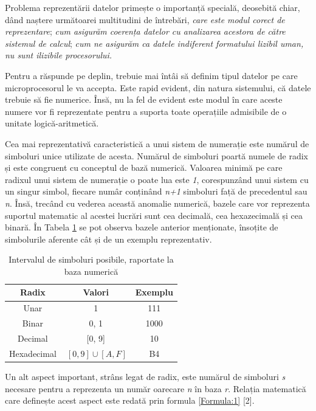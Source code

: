 \documentclass[12pt]{article}
\begin{document}
Problema reprezentării datelor primește o importanță specială, deosebită chiar, dând naștere următoarei multitudini de întrebări, \textit{care este modul corect de reprezentare}; \textit{cum asigurăm coerența datelor cu analizarea acestora de către sistemul de calcul}; \textit{cum ne asigurăm ca datele indiferent formatului lizibil uman, nu sunt ilizibile procesorului.}


Pentru a răspunde pe deplin, trebuie mai întâi să definim tipul datelor pe care microprocesorul le va accepta. Este rapid evident, din natura sistemului, că datele trebuie să fie numerice. Însă, nu la fel de evident este modul în care aceste numere vor fi reprezentate pentru a suporta toate operațiile admisibile de o unitate logică-aritmetică.

Cea mai reprezentativă caracteristică a unui sistem de numerație este numărul de simboluri unice utilizate de acesta. Numărul de simboluri poartă numele de radix și este congruent cu conceptul de bază numerică. Valoarea minimă pe care radixul unui sistem de numerație o poate lua este \textit{1}, corespunzând unui sistem cu un singur simbol, fiecare numâr conținând \textit{n+1} simboluri față de precedentul sau \textit{n}. Însă, trecând cu vederea această anomalie numerică, bazele care vor reprezenta suportul matematic al acestei lucrări sunt cea decimală, cea hexazecimală și cea binară. În Tabela \ref{Tabela:1} se pot observa bazele anterior menționate, însoțite de simbolurile aferente cât și de un exemplu reprezentativ.

\begin{table}[h]
\centering

\begin{tabular}{ ||c|c|c|| }
 \hline
 Radix & Valori & Exemplu \\ 
 \hline  \hline
 Unar & 1 & 111\\
 \hline
 Binar & 0, 1 & 1000\\ 
 \hline
 Decimal & [0, 9]  & 10\\ 
 \hline 
 Hexadecimal & $\ [0, 9] \cup [A, F]$ & B4\\ 
 \hline
\end{tabular} \caption{Intervalul de simboluri posibile, raportate la baza numerică }
 \label{Tabela:1}
\end{table}

Un alt aspect important, strâns legat de radix, este numărul de simboluri \textit{s} necesare pentru a reprezenta un număr oarecare \textit{n} în baza \textit{r}. Relația matematică care definește acest aspect este redată prin formula \ref{Formula:1} [2].
\end{document}
